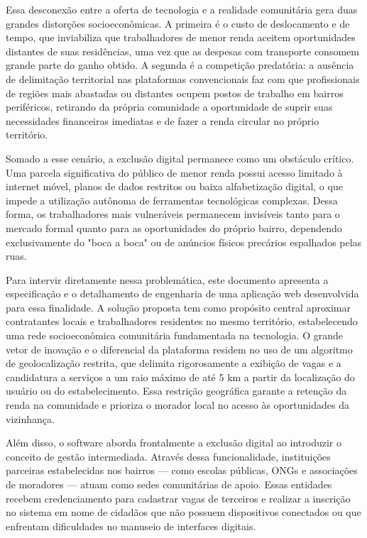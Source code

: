 \documentclass[
    12pt,
    oneside,
    a4paper,
    brazil
]{abntex2}
\begin{document}
Essa desconexão entre a oferta de tecnologia e a realidade comunitária gera duas grandes distorções socioeconômicas. A primeira é o custo de deslocamento e de tempo, que inviabiliza que trabalhadores de menor renda aceitem oportunidades distantes de suas residências, uma vez que as despesas com transporte consomem grande parte do ganho obtido. A segunda é a competição predatória: a ausência de delimitação territorial nas plataformas convencionais faz com que profissionais de regiões mais abastadas ou distantes ocupem postos de trabalho em bairros periféricos, retirando da própria comunidade a oportunidade de suprir suas necessidades financeiras imediatas e de fazer a renda circular no próprio território.

Somado a esse cenário, a exclusão digital permanece como um obstáculo crítico. Uma parcela significativa do público de menor renda possui acesso limitado à internet móvel, planos de dados restritos ou baixa alfabetização digital, o que impede a utilização autônoma de ferramentas tecnológicas complexas. Dessa forma, os trabalhadores mais vulneráveis permanecem invisíveis tanto para o mercado formal quanto para as oportunidades do próprio bairro, dependendo exclusivamente do "boca a boca" ou de anúncios físicos precários espalhados pelas ruas.

Para intervir diretamente nessa problemática, este documento apresenta a especificação e o detalhamento de engenharia de uma aplicação web desenvolvida para essa finalidade. A solução proposta tem como propósito central aproximar contratantes locais e trabalhadores residentes no mesmo território, estabelecendo uma rede socioeconômica comunitária fundamentada na tecnologia. O grande vetor de inovação e o diferencial da plataforma residem no uso de um algoritmo de geolocalização restrita, que delimita rigorosamente a exibição de vagas e a candidatura a serviços a um raio máximo de até 5 km a partir da localização do usuário ou do estabelecimento. Essa restrição geográfica garante a retenção da renda na comunidade e prioriza o morador local no acesso às oportunidades da vizinhança.

Além disso, o software aborda frontalmente a exclusão digital ao introduzir o conceito de gestão intermediada. Através dessa funcionalidade, instituições parceiras estabelecidas nos bairros — como escolas públicas, ONGs e associações de moradores — atuam como sedes comunitárias de apoio. Essas entidades recebem credenciamento para cadastrar vagas de terceiros e realizar a inscrição no sistema em nome de cidadãos que não possuem dispositivos conectados ou que enfrentam dificuldades no manuseio de interfaces digitais.
\end{document}
